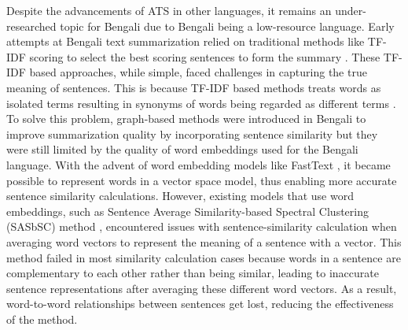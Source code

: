 \documentclass[acmlarge]{acmart}
\begin{document}
Despite the advancements of ATS in other languages, it remains an under-researched topic for Bengali due to Bengali being a low-resource language. Early attempts at Bengali text summarization relied on traditional methods like TF-IDF scoring to select the best scoring sentences to form the summary \cite{Akter-2017-tfidf-3, das-2022-tfidf, sarkar-2012-tfidf, sarkar-2012-tfidf-2}. These TF-IDF based approaches, while simple, faced challenges in capturing the true meaning of sentences. This is because TF-IDF based methods treats words as isolated terms resulting in synonyms of words being regarded as different terms \cite{tas-2017-rev-text-sum-2}. To solve this problem, graph-based methods were introduced in Bengali to improve summarization quality by incorporating sentence similarity but they were still limited by the quality of word embeddings used for the Bengali language. With the advent of word embedding models like FastText \cite{grave-etal-2018-fasttext}, it became possible to represent words in a vector space model, thus enabling more accurate sentence similarity calculations. However, existing models that use word embeddings, such as Sentence Average Similarity-based Spectral Clustering (SASbSC) method \cite{roychowdhury-etal-2022-spectral-base}, encountered issues with sentence-similarity calculation when averaging word vectors to represent the meaning of a sentence with a vector. This method failed in most similarity calculation cases because words in a sentence are complementary to each other rather than being similar, leading to inaccurate sentence representations after averaging these different word vectors. As a result, word-to-word relationships between sentences get lost, reducing the effectiveness of the method.
\end{document}
